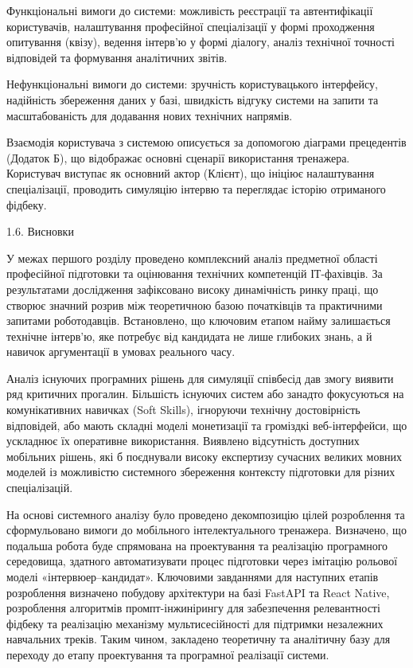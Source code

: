 Функціональні вимоги до системи: можливість реєстрації та автентифікації
користувачів, налаштування професійної спеціалізації у формі проходження
опитування (квізу), ведення інтерв'ю у формі діалогу, аналіз технічної
точності відповідей та формування аналітичних звітів.

Нефункціональні вимоги до системи: зручність користувацького інтерфейсу,
надійність збереження даних у базі, швидкість відгуку системи на запити
та масштабованість для додавання нових технічних напрямів.

Взаємодія користувача з системою описується за допомогою діаграми
прецедентів (Додаток Б), що відображає основні сценарії використання
тренажера. Користувач виступає як основний актор (Клієнт), що ініціює
налаштування спеціалізації, проводить симуляцію інтерв\textquotesingle ю
та переглядає історію отриманого фідбеку.

\protect{}\label{_Toc228981057}{}1.6. Висновки

У межах першого розділу проведено комплексний аналіз предметної області
професійної підготовки та оцінювання технічних компетенцій ІТ-фахівців.
За результатами дослідження зафіксовано високу динамічність ринку праці,
що створює значний розрив між теоретичною базою початківців та
практичними запитами роботодавців. Встановлено, що ключовим етапом найму
залишається технічне інтерв'ю, яке потребує від кандидата не лише
глибоких знань, а й навичок аргументації в умовах реального часу.

Аналіз існуючих програмних рішень для симуляції співбесід дав змогу
виявити ряд критичних прогалин. Більшість існуючих систем або занадто
фокусуються на комунікативних навичках (Soft Skills), ігноруючи технічну
достовірність відповідей, або мають складні моделі монетизації та
громіздкі веб-інтерфейси, що ускладнює їх оперативне використання.
Виявлено відсутність доступних мобільних рішень, які б поєднували високу
експертизу сучасних великих мовних моделей із можливістю системного
збереження контексту підготовки для різних спеціалізацій.

На основі системного аналізу було проведено декомпозицію цілей
розроблення та сформульовано вимоги до мобільного інтелектуального
тренажера. Визначено, що подальша робота буде спрямована на проектування
та реалізацію програмного середовища, здатного автоматизувати процес
підготовки через імітацію рольової моделі
«інтерв\textquotesingle юер--кандидат». Ключовими завданнями для
наступних етапів розроблення визначено побудову архітектури на базі
FastAPI та React Native, розроблення алгоритмів промпт-інжинірингу для
забезпечення релевантності фідбеку та реалізацію механізму
мультисесійності для підтримки незалежних навчальних треків. Таким
чином, закладено теоретичну та аналітичну базу для переходу до етапу
проектування та програмної реалізації системи.

